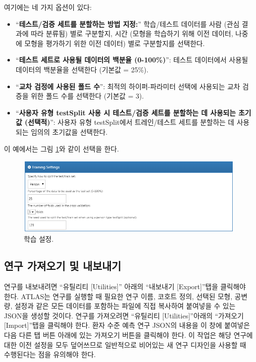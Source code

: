\documentclass[11pt]{book}
\providecommand{\tightlist}{%
  \setlength{\itemsep}{0pt}\setlength{\parskip}{0pt}}
\theoremstyle{definition}
\theoremstyle{definition}
\theoremstyle{definition}
\theoremstyle{remark}
\begin{document}
여기에는 네 가지 옵션이 있다:

\begin{itemize}
\tightlist
\item
  ``\textbf{테스트/검증 세트를 분할하는 방법 지정:}'' 학습/테스트
  데이터를 사람 (관심 결과에 따라 분류됨) 별로 구분할지, 시간 (모형을
  학습하기 위해 이전 데이터, 나중에 모형을 평가하기 위한 이전 데이터)
  별로 구분할지를 선택한다.
\item
  ``\textbf{테스트 세트로 사용될 데이터의 백분율 (0-100\%)}'': 테스트
  데이터에서 사용될 데이터의 백분율을 선택한다 (기본값 = 25\%).
\item
  ``\textbf{교차 검정에 사용된 폴드 수}'': 최적의 하이퍼-파라미터 선택에
  사용되는 교차 검증을 위한 폴드 수를 선택한다 (기본값 = 3).
\item
  ``\textbf{사용자 유형 testSplit 사용 시 테스트/검증 세트를 분할하는 데
  사용되는 초기값 (선택적)}'': 사용자 유형 testSplit에서 트레인/테스트
  세트를 분할하는 데 사용되는 임의의 초기값을 선택한다.
\end{itemize}

이 예에서는 그림 \ref{fig:trainingSettings}와 같이 선택을 한다.

\begin{figure}

{\centering \includegraphics[width=1\linewidth]{images/PatientLevelPrediction/trainingSettings} 

}

\caption{학습 설정.}\label{fig:trainingSettings}
\end{figure}

\subsection{연구 가져오기 및 내보내기}\label{---}

연구를 내보내려면 ``유틸리티 {[}Utilities{]}'' 아래의 ``내보내기
{[}Export{]}''탭을 클릭해야 한다. ATLAS는 연구를 실행할 때 필요한 연구
이름, 코호트 정의, 선택된 모형, 공변량, 설정과 같은 모든 데이터를
포함하는 파일에 직접 복사하여 붙여넣을 수 있는 JSON을 생성할 것이다.
연구를 가져오려면 ``유틸리티 {[}Utilities{]}''아래의 ``가져오기
{[}Import{]}''탭을 클릭해야 한다. 환자 수준 예측 연구 JSON의 내용을 이
창에 붙여넣은 다음 다른 탭 버튼 아래에 있는 가져오기 버튼을 클릭해야
한다. 이 작업은 해당 연구에 대한 이전 설정을 모두 덮어쓰므로 일반적으로
비어있는 새 연구 디자인을 사용할 때 수행된다는 점을 유의해야 한다.
\end{document}
